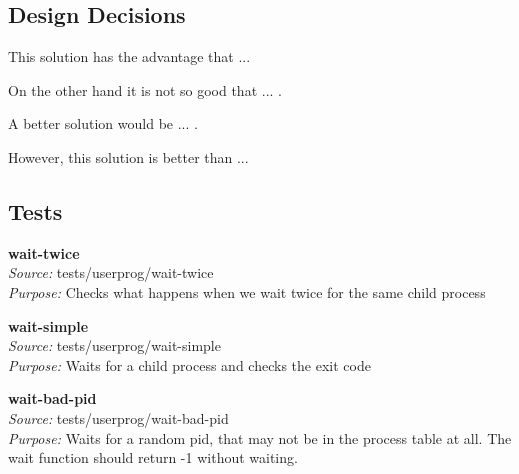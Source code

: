 {    %



    \subsection{Design Decisions}

	This solution has the advantage that ... 

	On the other hand it is not so good that ... . 

	A better solution would be ... . 

	However, this solution is better than ...

    \subsection{Tests}

    \textbf{wait-twice}\\
      \textit{Source:} tests/userprog/wait-twice\\
      \textit{Purpose:} Checks what happens when we wait twice for the same child process


      \textbf{wait-simple}\\
      \textit{Source:} tests/userprog/wait-simple\\
      \textit{Purpose:} Waits for a child process and checks the exit code

    \textbf{wait-bad-pid} \\
    \textit{Source:} tests/userprog/wait-bad-pid\\
    \textit{Purpose:} Waits for a random pid, that may not be in the process table at all. The wait function should return -1 without waiting.
    
}

